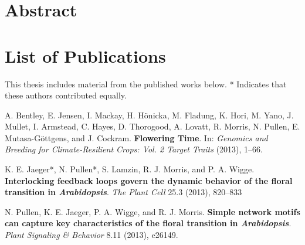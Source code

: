 \documentclass{nicksclass}
\begin{document}
\strictpagecheck%

\thispagestyle{empty}
\myTitlePage
\restoregeometry
\thispagestyle{empty}

\cleardoublepage
\thispagestyle{empty}
\chapter*{Abstract}

\thispagestyle{empty}
\clearpage
\thispagestyle{empty}

{\hsize 441pt
\tableofcontents
\cleardoublepage}

\chapter*{List of Publications}
  This thesis includes material from the published works below.\newline
  * Indicates that these authors contributed equally.

\vspace{1cm}\noindent
A. Bentley, E. Jensen, I. Mackay, H. Hönicka, M. Fladung, K. Hori, M. Yano, J. Mullet, I. Armstead, C. Hayes, D. Thorogood, A. Lovatt, R. Morris, N. Pullen, E. Mutasa-Göttgens, and J. Cockram. \textbf{Flowering Time}. In: \emph{Genomics and Breeding for Climate-Resilient Crops: Vol. 2 Target Traits} (2013), 1--66.

\vspace{1cm}\noindent
K. E. Jaeger*, N. Pullen*, S. Lamzin, R. J. Morris, and P. A. Wigge. \textbf{Interlocking feedback loops govern the dynamic behavior of the floral transition in \emph{Arabidopsis}}. \emph{The Plant Cell} 25.3 (2013), 820--833

\vspace{1cm}\noindent
N. Pullen, K. E. Jaeger, P. A. Wigge, and R. J. Morris. \textbf{Simple network motifs can capture key characteristics of the floral transition in \emph{Arabidopsis}}. \emph{Plant Signaling \& Behavior} 8.11 (2013), e26149.
\end{document}

